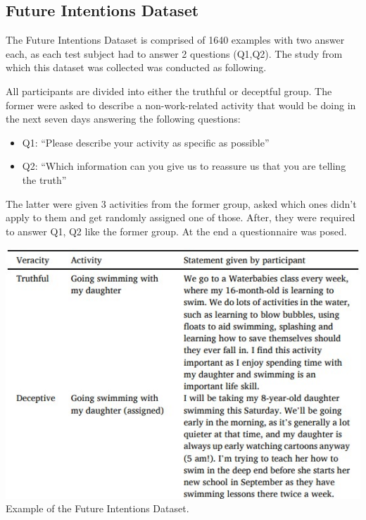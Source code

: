 \documentclass[10pt,twocolumn,letterpaper]{article}
\begin{document}
\subsection{Future Intentions Dataset}

The Future Intentions Dataset is comprised of 1640 examples with two answer each, as each test subject had to answer 2 questions (Q1,Q2).
The study from which this dataset was collected was conducted as following.

All participants are divided into either the truthful or deceptful group.
The former were asked to describe a non-work-related activity that would be doing in the next seven days answering the following questions:

\begin{itemize}
    \item Q1: “Please describe your activity as specific as possible”
    \item Q2: “Which information can you give us to reassure us that you are telling the truth”
\end{itemize}

The latter were given 3 activities from the former group, asked which ones didn’t apply to them and get 
randomly assigned one of those. After, they were required to answer Q1, Q2 like the former group.
At the end a questionnaire was posed. \\

\begin{center}
    \includegraphics[scale=0.65]{img/future_intentions_dataset.jpg} \\
    \small {Example of the Future Intentions Dataset.} \\
\end{center} 
\end{document}
